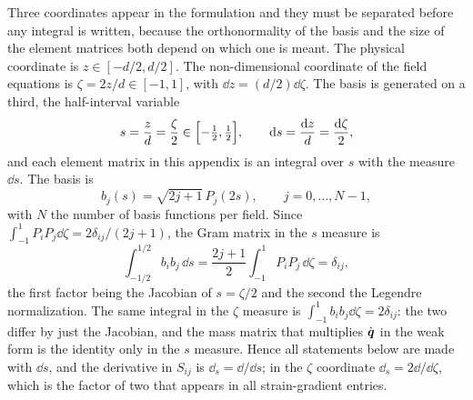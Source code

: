 Three coordinates appear in the formulation and they must be separated before
any integral is written, because the orthonormality of the basis and the size of
the element matrices both depend on which one is meant.  The physical coordinate
is $z\in[-d/2,d/2]$.  The non-dimensional coordinate of the field equations is
$\zeta=2z/d\in[-1,1]$, with $\dd z=(d/2)\dd\zeta$.  The basis is generated on a
third, the half-interval variable
\begin{equation}
\label{eq:app_measures}
s=\frac{z}{d}=\frac{\zeta}{2}\in\Bigl[-\tfrac12,\tfrac12\Bigr],
\qquad
\mathrm{d} s=\frac{\mathrm{d} z}{d}=\frac{\mathrm{d}\zeta}{2},
\end{equation}
and each element matrix in this appendix is an integral over $s$ with the
measure $\dd s$.  The basis is
\begin{equation}
\label{eq:app_basis}
b_j(s)=\sqrt{2j+1}\,P_j(2s),\qquad j=0,\dots,N-1,
\end{equation}
with $N$ the number of basis functions per field.  Since
$\int_{-1}^{1}P_iP_j\dd\zeta=2\delta_{ij}/(2j+1)$, the Gram matrix in the $s$
measure is
\begin{equation*}
\int_{-1/2}^{1/2}b_ib_j\,\dd s
=\frac{2j+1}{2}\int_{-1}^{1}P_iP_j\,\dd\zeta=\delta_{ij},
\end{equation*}
the first factor being the Jacobian of $s=\zeta/2$ and the second the Legendre
normalization.  The same integral in the $\zeta$ measure is
$\int_{-1}^{1}b_ib_j\dd\zeta=2\delta_{ij}$: the two differ by just the Jacobian, and the mass matrix that multiplies $\dot{\boldsymbol{q}}$ in the weak form is
the identity only in the $s$ measure.  Hence all statements below are made with $\dd s$, and the derivative in $S_{ij}$ is $\dd_s=\dd/\dd s$; in the $\zeta$
coordinate $\dd_s=2\dd/\dd\zeta$, which is the factor of two that appears in all strain-gradient entries.

